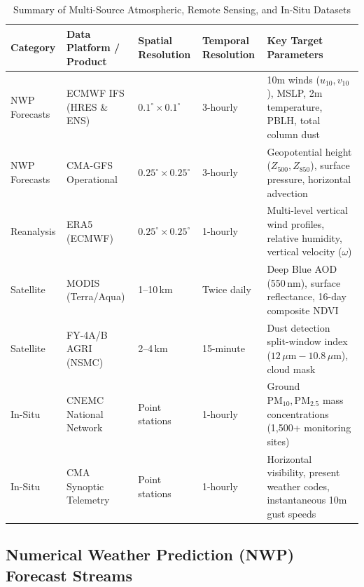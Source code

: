 \begin{table}[H]
\centering
\small
\caption{Summary of Multi-Source Atmospheric, Remote Sensing, and In-Situ Datasets}
\label{tab:data_sources_summary}
\begin{tabularx}{\textwidth}{l p{2.5cm} p{2.2cm} p{2.0cm} X}
\toprule
\textbf{Category} & \textbf{Data Platform / Product} & \textbf{Spatial Resolution} & \textbf{Temporal Resolution} & \textbf{Key Target Parameters} \\
\midrule
NWP Forecasts & ECMWF IFS (HRES \& ENS) & $0.1^\circ \times 0.1^\circ$ & 3-hourly & 10m winds ($u_{10}, v_{10}$), MSLP, 2m temperature, PBLH, total column dust \\
NWP Forecasts & CMA-GFS Operational & $0.25^\circ \times 0.25^\circ$ & 3-hourly & Geopotential height ($Z_{500}, Z_{850}$), surface pressure, horizontal advection \\
Reanalysis & ERA5 (ECMWF) & $0.25^\circ \times 0.25^\circ$ & 1-hourly & Multi-level vertical wind profiles, relative humidity, vertical velocity ($\omega$) \\
Satellite & MODIS (Terra/Aqua) & 1--10\,km & Twice daily & Deep Blue AOD (550\,nm), surface reflectance, 16-day composite NDVI \\
Satellite & FY-4A/B AGRI (NSMC) & 2--4\,km & 15-minute & Dust detection split-window index ($12\,\mu\text{m} - 10.8\,\mu\text{m}$), cloud mask \\
In-Situ & CNEMC National Network & Point stations & 1-hourly & Ground $\text{PM}_{10}, \text{PM}_{2.5}$ mass concentrations (1{,}500+ monitoring sites) \\
In-Situ & CMA Synoptic Telemetry & Point stations & 1-hourly & Horizontal visibility, present weather codes, instantaneous 10m gust speeds \\
\bottomrule
\end{tabularx}
\end{table}

\subsection{Numerical Weather Prediction (NWP) Forecast Streams}
\label{subsec:nwp_data}

